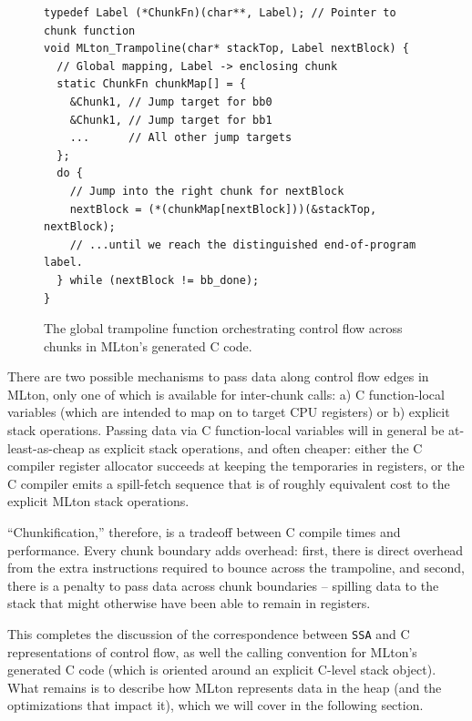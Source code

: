 \begin{figure}[htbp]
  \centering
\begin{verbatim}
typedef Label (*ChunkFn)(char**, Label); // Pointer to chunk function
void MLton_Trampoline(char* stackTop, Label nextBlock) {
  // Global mapping, Label -> enclosing chunk
  static ChunkFn chunkMap[] = {
    &Chunk1, // Jump target for bb0
    &Chunk1, // Jump target for bb1
    ...      // All other jump targets
  };
  do {
    // Jump into the right chunk for nextBlock
    nextBlock = (*(chunkMap[nextBlock]))(&stackTop, nextBlock);
    // ...until we reach the distinguished end-of-program label.
  } while (nextBlock != bb_done);
}
\end{verbatim}
  \caption{The global trampoline function orchestrating control flow across chunks in MLton's generated C code.}
  \label{fig:mlton_trampoline}
\end{figure}


There are two possible mechanisms to pass data along control flow edges in
MLton, only one of which is available for inter-chunk calls: a) C function-local
variables (which are intended to map on to target CPU registers) or b) explicit
stack operations. Passing data via C function-local variables will in general be
at-least-as-cheap as explicit stack operations, and often cheaper:
either the C compiler
register allocator succeeds at keeping the temporaries in registers, or the C
compiler emits a spill-fetch sequence that is of roughly equivalent cost to the
explicit MLton stack operations.

``Chunkification,'' therefore, is a tradeoff between C compile times and
performance. Every chunk boundary adds overhead: first, there is direct overhead
from the extra instructions required to bounce across the trampoline, and
second, there is a penalty to pass data across chunk boundaries -- spilling data
to the stack that might otherwise have been able to remain in registers.

This completes the discussion of the correspondence between \texttt{SSA} and C
representations of control flow, as well the calling convention for MLton's
generated C code (which is oriented around an explicit C-level stack object).
What remains is to describe how MLton represents data in the heap (and the
optimizations that impact it), which we will cover in the following section.


